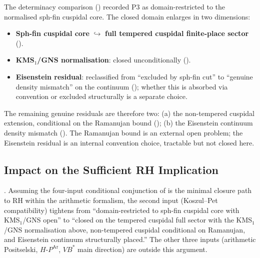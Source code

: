 \begin{remark}
\label{v4-arith:kms-gns:rem:P3-domain-enlargement}
The determinacy comparison () recorded P3 as
domain-restricted to the normalised sph-fin cuspidal core. The closed
domain enlarges in two dimensions:
\begin{itemize}
\item \textbf{Sph-fin cuspidal core} \(\hookrightarrow\) \textbf{full
tempered cuspidal finite-place sector}
().
\item \textbf{KMS\({}_{1}\)/GNS normalisation}: closed unconditionally
().
\item \textbf{Eisenstein residual}: reclassified from
``excluded by sph-fin cut'' to ``genuine density mismatch'' on the
continuum (); whether
this is absorbed via convention or excluded structurally is a
separate choice.
\end{itemize}
The remaining genuine residuals are therefore two: (a) the
non-tempered cuspidal extension, conditional on the Ramanujan bound
(); (b) the
Eisenstein continuum density mismatch
(). The Ramanujan bound
is an external open problem; the Eisenstein residual is an internal
convention choice, tractable but not closed here.
\end{remark}

\subsection{Impact on the Sufficient RH Implication}
\label{v4-arith:kms-gns:P3:rh}

\begin{corollary}
\label{v4-arith:kms-gns:cor:rh-minimal-updated}
\ClaimStatusConditional. Assuming the four-input conditional conjunction of
 is the minimal
closure path to RH within the arithmetic formalism, the second input
(Koszul--Pet compatibility) tightens from
``domain-restricted to sph-fin cuspidal core with KMS\({}_{1}\)/GNS
open'' to ``closed on the tempered cuspidal full sector with the
KMS\({}_{1}\)/GNS normalisation above, non-tempered cuspidal
conditional on Ramanujan, and Eisenstein continuum structurally
placed.'' The other three inputs (arithmetic Positselski,
\(H\text{-}P^{\mathrm{Ar}}\), \(VB^{*}\) main direction) are outside
this argument.
\end{corollary}


